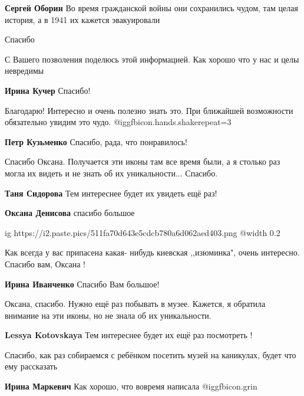 \begin{itemize}
\begin{itemize}
\textbf{Сергей Оборин} Во время гражданской войны они сохранились чудом, там целая история, а в 1941 их кажется эвакуировали
\end{itemize} %

Спасибо

С Вашего позволения поделюсь этой информацией. Как хорошо что у нас и целы невредимы

\textbf{Ирина Кучер} Спасибо!


Благодарю! Интересно и очень полезно знать это. При ближайшей возможности
обязательно увидим это чудо. @igg{fbicon.hands.shake}{repeat=3} 

\textbf{Петр Кузьменко} Спасибо, рада, что понравилось!


Спасибо Оксана. Получается эти иконы там все время были, а я столько раз могла их
видеть и не знать об их уникальности... Спасибо.

\begin{itemize} %
\textbf{Таня Сидорова} Тем интереснее будет их увидеть ещё раз!

\textbf{Оксана Денисова} спасибо большое
\end{itemize} %


\ifcmt
  ig https://i2.paste.pics/511fa70d643e5cdcb780a6d062aed403.png
  @width 0.2
\fi

Как всегда у вас припасена какая- нибудь киевская ,,изюминка", очень интересно.
Спасибо вам, Оксана !


\textbf{Ирина Иванченко} Спасибо Вам большое!

Оксана, спасибо.
Нужно ещё раз побывать в музее.
Кажется, я обратила внимание на эти иконы, но не знала об их уникальности.

\textbf{Lessya Kotovskaya} Тем интереснее будет их ещё раз посмотреть !


Спасибо, как раз собираемся с ребёнком посетить музей на каникулах, будет что
ему рассказать

\textbf{Ирина Маркевич} Как хорошо, что вовремя написала @igg{fbicon.grin} 


\end{itemize}
